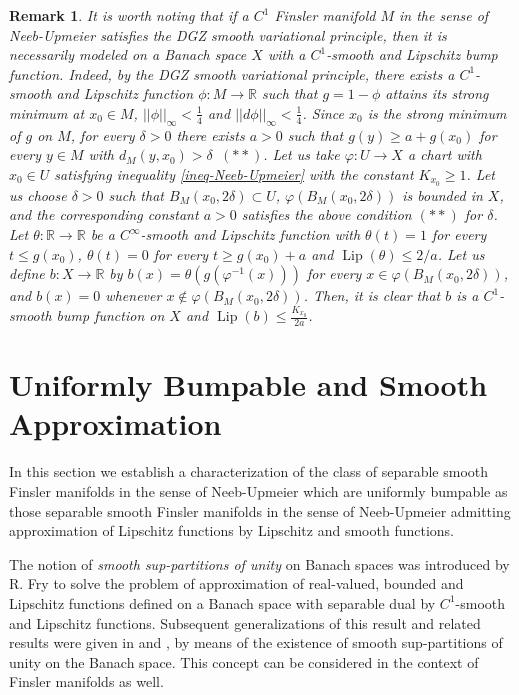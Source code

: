\documentclass[11pt]{amsart}
\newtheorem{rem}[thm]{Remark}
\numberwithin{equation}{section}
\begin{document}
\begin{rem}
It is worth noting that  if a $C^1$ Finsler manifold $M$  in the sense of Neeb-Upmeier  satisfies the \emph{DGZ smooth variational principle}, then it  is necessarily modeled on a Banach space $X$ with  a $C^1$-smooth and Lipschitz bump function. Indeed, by the DGZ smooth variational principle, there exists a $C^1$-smooth and Lipschitz function $\phi:M\to {\mathbb{R}}$ such that $g=1-\phi$ attains its strong minimum at $x_0\in M$, $||\phi||_\infty < \frac{1}{4}$ and $||d\phi||_\infty <\frac{1}{4}$. Since $x_0$ is the strong minimum of $g$ on $M$, for every $\delta>0$ there exists $a>0$ such that $g(y)\ge a +g(x_0)$ for every $y\in M$ with $d_M(y,x_0)>\delta$ $\,(**)$. Let us take $\varphi:U\to X$ a chart with $x_0\in U$  satisfying  inequality \eqref{ineq-Neeb-Upmeier} with the constant
$K_{x_0}\ge 1$. Let us choose  $\delta>0$ such that $B_M(x_0,2\delta)\subset U$, $\varphi(B_M(x_0,2\delta))$ is bounded in $X$, and the corresponding constant $a>0$ satisfies the above condition $(**)$ for $\delta$. Let $\theta:{\mathbb{R}}\to {\mathbb{R}}$ be  a $C^\infty$-smooth and Lipschitz function  with $\theta(t)=1$ for every $t\le g(x_0)$, $\theta(t)=0$ for every $t\ge g(x_0) +a$ and ${\operatorname{Lip}}(\theta)\le 2/a$. Let us define $b:X\to {\mathbb{R}}$ by $b(x)=\theta(g(\varphi^{-1}(x)))$  for every $x\in \varphi(B_M(x_0,2\delta))$, and $b(x)=0$  whenever $x\not\in  \varphi(B_M(x_0,2\delta))$. Then, it is clear that $b$ is a $C^1$-smooth bump function on
$X$ and ${\operatorname{Lip}}(b)\le \frac{K_{x_0}}{2a}$.
\end{rem}

 

\section{Uniformly Bumpable and Smooth Approximation}
In this section we establish a characterization of the class of separable  smooth Finsler manifolds in the sense of Neeb-Upmeier which are uniformly bumpable as those separable smooth Finsler manifolds in the sense of Neeb-Upmeier admitting approximation of Lipschitz functions by Lipschitz and smooth functions.

The notion of  \emph{smooth sup-partitions of unity} on Banach spaces was introduced by R. Fry \cite{Fry1} to solve the problem of approximation of real-valued, bounded and Lipschitz functions defined on a Banach space with separable dual
 by $C^1$-smooth and Lipschitz functions. Subsequent generalizations of this result and related results were given in \cite{azafrymon} 
  and \cite{HajekJohanis}, by means of the existence of smooth sup-partitions of unity on the Banach space. This concept can be considered  in the context of Finsler manifolds as well.
\end{document}
